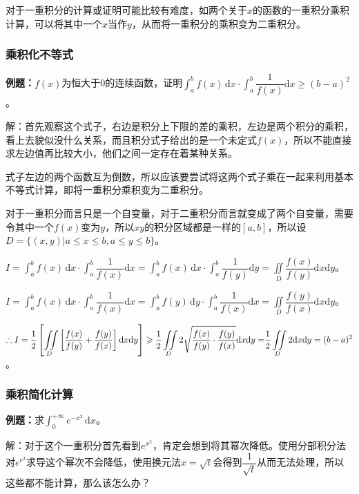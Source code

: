 \documentclass[UTF8, 12pt]{ctexart}
\begin{document}
对于一重积分的计算或证明可能比较有难度，如两个关于$x$的函数的一重积分乘积计算，可以将其中一个$x$当作$y$，从而将一重积分的乘积变为二重积分。

\subsubsection{乘积化不等式}

\textbf{例题：}$f(x)$为恒大于0的连续函数，证明$\displaystyle{\int_a^bf(x)\,\textrm{d}x\cdot\int_a^b\dfrac{1}{f(x)}\textrm{d}x\geqslant(b-a)^2}$。

解：首先观察这个式子，右边是积分上下限的差的乘积，左边是两个积分的乘积，看上去貌似没什么关系，而且积分式子给出的是一个未定式$f(x)$，所以不能直接求左边值再比较大小，他们之间一定存在着某种关系。

式子左边的两个函数互为倒数，所以应该要尝试将这两个式子乘在一起来利用基本不等式计算，即将一重积分乘积变为二重积分。

对于一重积分而言只是一个自变量，对于二重积分而言就变成了两个自变量，需要令其中一个$f(x)$变为$y$，所以$xy$的积分区域都是一样的$[a,b]$，所以设$D=\{(x,y)\vert a\leqslant x\leqslant b,a\leqslant y\leqslant b\}$。

$I=\displaystyle{\int_a^bf(x)\,\textrm{d}x\cdot\int_a^b\dfrac{1}{f(x)}\textrm{d}x}=\int_a^bf(x)\,\textrm{d}x\cdot\int_a^b\dfrac{1}{f(y)}\textrm{d}y=\iint\limits_D\dfrac{f(x)}{f(y)}\textrm{d}x\textrm{d}y$。

$I=\displaystyle{\int_a^bf(x)\,\textrm{d}x\cdot\int_a^b\dfrac{1}{f(x)}\textrm{d}x}=\int_a^bf(y)\,\textrm{d}y\cdot\int_a^b\dfrac{1}{f(x)}\textrm{d}x=\iint\limits_D\dfrac{f(y)}{f(x)}\textrm{d}x\textrm{d}y$。

$\therefore I=\displaystyle{\dfrac{1}{2}\left[\iint\limits_D\left[\dfrac{f(x)}{f(y)}+\dfrac{f(y)}{f(x)}\right]\textrm{d}x\textrm{d}y\right]\geqslant\dfrac{1}{2}\iint\limits_D2\sqrt{\dfrac{f(x)}{f(y)}\cdot\dfrac{f(y)}{f(x)}}\textrm{d}x\textrm{d}y=}\\\displaystyle{\dfrac{1}{2}\iint\limits_D2\textrm{d}x\textrm{d}y}=(b-a)^2$。

\subsubsection{乘积简化计算}

\textbf{例题：}求$\int_0^{+\infty}e^{-x^2}\,\textrm{d}x$。

解：对于这个一重积分首先看到$e^{x^2}$，肯定会想到将其幂次降低。使用分部积分法对$e^{e^2}$求导这个幂次不会降低，使用换元法$x=\sqrt{t}$会得到$\dfrac{1}{\sqrt{t}}$从而无法处理，所以这些都不能计算，那么该怎么办？
\end{document}
